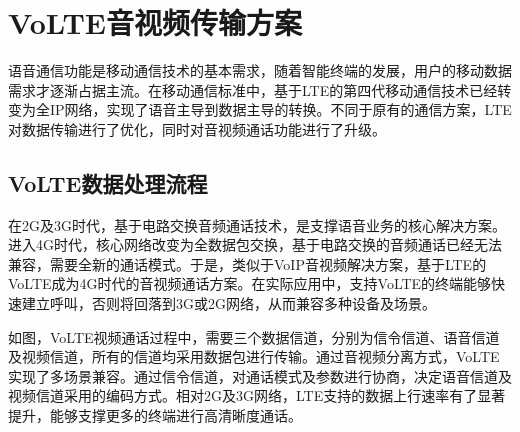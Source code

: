 \section{VoLTE音视频传输方案}
\label{chap:backinfo:volte}



语音通信功能是移动通信技术的基本需求，随着智能终端的发展，用户的移动数据需求才逐渐占据主流。在移动通信标准中，基于LTE的第四代移动通信技术已经转变为全IP网络，实现了语音主导到数据主导的转换。不同于原有的通信方案，LTE对数据传输进行了优化，同时对音视频通话功能进行了升级。

\subsection{VoLTE数据处理流程}
\label{chap:backinfo:volte:datastream}

在2G及3G时代，基于电路交换音频通话技术，是支撑语音业务的核心解决方案。进入4G时代，核心网络改变为全数据包交换，基于电路交换的音频通话已经无法兼容，需要全新的通话模式。于是，类似于VoIP音视频解决方案，基于LTE的VoLTE成为4G时代的音视频通话方案。在实际应用中，支持VoLTE的终端能够快速建立呼叫，否则将回落到3G或2G网络，从而兼容多种设备及场景。

如图，VoLTE视频通话过程中，需要三个数据信道，分别为信令信道、语音信道及视频信道，所有的信道均采用数据包进行传输。通过音视频分离方式，VoLTE实现了多场景兼容。通过信令信道，对通话模式及参数进行协商，决定语音信道及视频信道采用的编码方式。相对2G及3G网络，LTE支持的数据上行速率有了显著提升，能够支撑更多的终端进行高清晰度通话。

